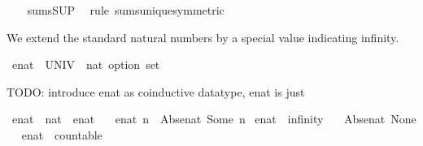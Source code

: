 \begin{isabellebody}
\ \ %
\endisadelimproof
%
\isatagproof
{}\isamarkupfalse%
\ sums{\isacharunderscore}SUP\ \isamarkupfalse%
\ {\isacharparenleft}rule\ sums{\isacharunderscore}unique{\isacharbrackleft}symmetric{\isacharbrackright}{\isacharparenright}%
\endisatagproof
{\isafoldproof}%
%
\isadelimproof
\isanewline
%
\endisadelimproof
\isanewline
{}\isamarkupfalse%
%
\isadelimdocument
%
\endisadelimdocument
%
\isatagdocument
%
\isamarkuptrue%
%
\endisatagdocument
{\isafolddocument}%
%
\isadelimdocument
%
\endisadelimdocument
%
\begin{isamarkuptext}%
We extend the standard natural numbers by a special value indicating
  infinity.%
\end{isamarkuptext}\isamarkuptrue%
\isamarkupfalse%
\ enat\ {\isacharequal}\ {\isachardoublequoteopen}UNIV\ {\isacharcolon}{\isacharcolon}\ nat\ option\ set{\isachardoublequoteclose}%
\isadelimproof
\ %
\endisadelimproof
%
\isatagproof
\isacommand{{\isachardot}{\isachardot}}\isamarkupfalse%
%
\endisatagproof
{\isafoldproof}%
%
\isadelimproof
%
\endisadelimproof
%
\begin{isamarkuptext}%
TODO: introduce enat as coinductive datatype, enat is just %
\end{isamarkuptext}\isamarkuptrue%
\isamarkupfalse%
\ enat\ {\isacharcolon}{\isacharcolon}\ {\isachardoublequoteopen}nat\ {\isasymRightarrow}\ enat{\isachardoublequoteclose}\ \isanewline
\ \ {\isachardoublequoteopen}enat\ n\ {\isacharequal}\ Abs{\isacharunderscore}enat\ {\isacharparenleft}Some\ n{\isacharparenright}{\isachardoublequoteclose}\isanewline
\isanewline
{}\isamarkupfalse%
\ enat\ {\isacharcolon}{\isacharcolon}\ infinity\isanewline
{}\isanewline
\isanewline
{}\isamarkupfalse%
\ {\isachardoublequoteopen}{\isasyminfinity}\ {\isacharequal}\ Abs{\isacharunderscore}enat\ None{\isachardoublequoteclose}\isanewline
{}\isamarkupfalse%
%
\isadelimproof
\ %
\endisadelimproof
%
\isatagproof
\isacommand{{\isachardot}{\isachardot}}\isamarkupfalse%
%
\endisatagproof
{\isafoldproof}%
%
\isadelimproof
%
\endisadelimproof
\isanewline
\isanewline
{}\isamarkupfalse%
\isanewline
\isanewline
{}\isamarkupfalse%
\ enat\ {\isacharcolon}{\isacharcolon}\ countable\isanewline
%
\isadelimproof
%
\endisadelimproof
%
\isatagproof
{}\isamarkupfalse%
\isanewline
\ \ \isamarkupfalse%

\end{isabellebody}
